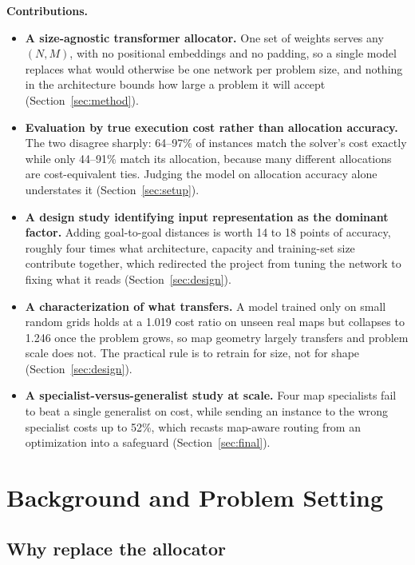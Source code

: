 \documentclass[11pt,a4paper]{article}
\begin{document}
\noindent\textbf{Contributions.}
\begin{itemize}
  \item \textbf{A size-agnostic transformer allocator.} One set of weights serves any $(N,M)$, with
        no positional embeddings and no padding, so a single model replaces what would otherwise be
        one network per problem size, and nothing in the architecture bounds how large a problem it
        will accept (Section~\ref{sec:method}).
  \item \textbf{Evaluation by true execution cost rather than allocation accuracy.} The two
        disagree sharply: 64--97\% of instances match the solver's cost exactly while only 44--91\%
        match its allocation, because many different allocations are cost-equivalent ties. Judging
        the model on allocation accuracy alone understates it (Section~\ref{sec:setup}).
  \item \textbf{A design study identifying input representation as the dominant factor.} Adding
        goal-to-goal distances is worth 14 to 18 points of accuracy, roughly four times what
        architecture, capacity and training-set size contribute together, which redirected the
        project from tuning the network to fixing what it reads (Section~\ref{sec:design}).
  \item \textbf{A characterization of what transfers.} A model trained only on small random grids
        holds at a 1.019 cost ratio on unseen real maps but collapses to 1.246 once the problem
        grows, so map geometry largely transfers and problem scale does not. The practical rule is
        to retrain for size, not for shape (Section~\ref{sec:design}).
  \item \textbf{A specialist-versus-generalist study at scale.} Four map specialists fail to beat a
        single generalist on cost, while sending an instance to the wrong specialist costs up to
        52\%, which recasts map-aware routing from an optimization into a safeguard
        (Section~\ref{sec:final}).
\end{itemize}

\section{Background and Problem Setting}

\subsection{Why replace the allocator}
\end{document}
